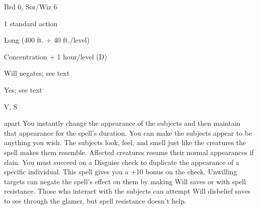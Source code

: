 
\begin{description*}
\item[Level:] Brd 6, Sor/Wiz 6
\item[Casting Time:] 1 standard action
\item[Range:] Long (400 ft. + 40 ft./level)
\item[Duration:] Concentration + 1 hour/level (D)
\item[Saving Throw:] Will negates; see text
\item[Spell Resistance:] Yes; see text
\item[Components:] V, S
\end{description*}

apart
You instantly change the appearance of the subjects and then maintain that appearance
for the spell's duration. You can make the subjects appear to be anything you wish.
The subjects look, feel, and smell just like the creatures the spell makes them
resemble. Affected creatures resume their normal appearances if slain. You must
succeed on a Disguise check to duplicate the appearance of a specific individual.
This spell gives you a +10 bonus on the check.
Unwilling targets can negate the spell's effect on them by making Will saves or
with spell resistance. Those who interact with the subjects can attempt Will disbelief
saves to see through the glamer, but spell resistance doesn't help.